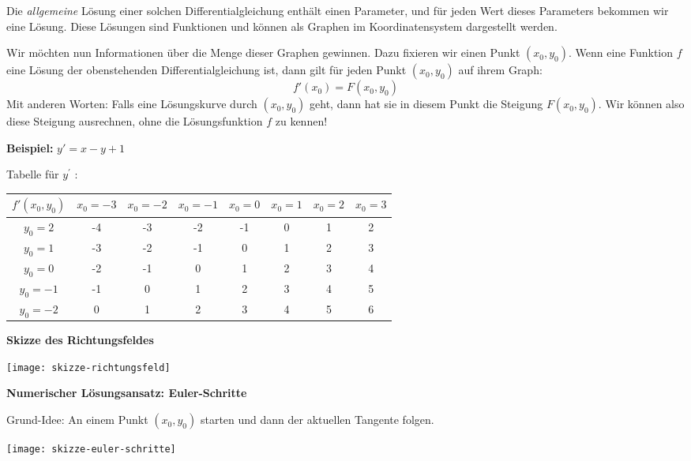 Die \emph{allgemeine} Lösung einer solchen Differentialgleichung enthält einen Parameter, und für jeden Wert dieses Parameters bekommen wir eine Lösung.
Diese Lösungen sind Funktionen und können als Graphen im Koordinatensystem dargestellt werden.

Wir möchten nun Informationen über die Menge dieser Graphen gewinnen.
Dazu fixieren wir einen Punkt $(x_0, y_0)$.
Wenn eine Funktion $f$ eine Lösung der obenstehenden Differentialgleichung ist, dann gilt für jeden Punkt $(x_0, y_0)$ auf ihrem Graph: \[f'(x_0) = F(x_0, y_0)\]
Mit anderen Worten: Falls eine Lösungskurve durch $(x_0, y_0)$ geht, dann hat sie in diesem Punkt die Steigung $F(x_0, y_0)$.
Wir können also diese Steigung ausrechnen, ohne die Lösungsfunktion $f$ zu kennen!

\textbf{Beispiel:} $y' = x-y+1$

Tabelle für $y^{\prime}$ :
\begin{tabular}{|c|c|c|c|c|c|c|c|}
    \hline
    $f'(x_0, y_0)$ & $x_0=-3$ & $x_0=-2$ & $x_0=-1$ & $x_0=0$ & $x_0=1$ & $x_0=2$ & $x_0=3$ \\
    \hline
    $y_0=2$        & -4       & -3       & -2       & -1      & 0       & 1       & 2       \\
    \hline
    $y_0=1$        & -3       & -2       & -1       & 0       & 1       & 2       & 3       \\
    \hline
    $y_0=0$        & -2       & -1       & 0        & 1       & 2       & 3       & 4       \\
    \hline
    $y_0=-1$       & -1       & 0        & 1        & 2       & 3       & 4       & 5       \\
    \hline
    $y_0=-2$       & 0        & 1        & 2        & 3       & 4       & 5       & 6       \\
    \hline
\end{tabular}

\textbf{Skizze des Richtungsfeldes}
\begin{center}
    \texttt{[image: skizze-richtungsfeld]}
\end{center}

\textbf{Numerischer Lösungsansatz: Euler-Schritte}

Grund-Idee: An einem Punkt $(x_0,y_0)$ starten und dann der aktuellen Tangente folgen.
\begin{center}
    \texttt{[image: skizze-euler-schritte]}
\end{center}

